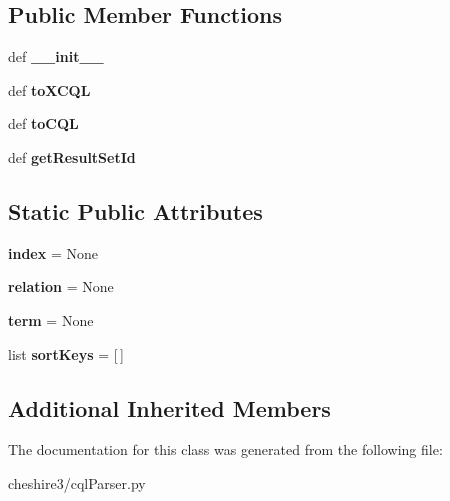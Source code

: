 \subsection*{Public Member Functions}
\begin{DoxyCompactItemize}
\item 
\hypertarget{classcheshire3_1_1cql_parser_1_1_search_clause_a29fa02f4112b5f9c53332258df13b3c6}{def {\bfseries \-\_\-\-\_\-init\-\_\-\-\_\-}}\label{classcheshire3_1_1cql_parser_1_1_search_clause_a29fa02f4112b5f9c53332258df13b3c6}

\item 
\hypertarget{classcheshire3_1_1cql_parser_1_1_search_clause_afaf19325a728553f53a8d809129e4011}{def {\bfseries to\-X\-C\-Q\-L}}\label{classcheshire3_1_1cql_parser_1_1_search_clause_afaf19325a728553f53a8d809129e4011}

\item 
\hypertarget{classcheshire3_1_1cql_parser_1_1_search_clause_a4e4ade8303178425e0bca827fdd34a3c}{def {\bfseries to\-C\-Q\-L}}\label{classcheshire3_1_1cql_parser_1_1_search_clause_a4e4ade8303178425e0bca827fdd34a3c}

\item 
\hypertarget{classcheshire3_1_1cql_parser_1_1_search_clause_ae90ff6f74f12d46195a5ef3fdfa607ae}{def {\bfseries get\-Result\-Set\-Id}}\label{classcheshire3_1_1cql_parser_1_1_search_clause_ae90ff6f74f12d46195a5ef3fdfa607ae}

\end{DoxyCompactItemize}
\subsection*{Static Public Attributes}
\begin{DoxyCompactItemize}
\item 
\hypertarget{classcheshire3_1_1cql_parser_1_1_search_clause_a00c1c24147a45070b366e256f4e92d91}{{\bfseries index} = None}\label{classcheshire3_1_1cql_parser_1_1_search_clause_a00c1c24147a45070b366e256f4e92d91}

\item 
\hypertarget{classcheshire3_1_1cql_parser_1_1_search_clause_a9ca0cf062af14d6995e9877bc8603791}{{\bfseries relation} = None}\label{classcheshire3_1_1cql_parser_1_1_search_clause_a9ca0cf062af14d6995e9877bc8603791}

\item 
\hypertarget{classcheshire3_1_1cql_parser_1_1_search_clause_a88e24294304ad71fe035cf32597eb3d2}{{\bfseries term} = None}\label{classcheshire3_1_1cql_parser_1_1_search_clause_a88e24294304ad71fe035cf32597eb3d2}

\item 
\hypertarget{classcheshire3_1_1cql_parser_1_1_search_clause_a3aa26092d3c81decddfb50ad757dd080}{list {\bfseries sort\-Keys} = \mbox{[}$\,$\mbox{]}}\label{classcheshire3_1_1cql_parser_1_1_search_clause_a3aa26092d3c81decddfb50ad757dd080}

\end{DoxyCompactItemize}
\subsection*{Additional Inherited Members}


The documentation for this class was generated from the following file\-:\begin{DoxyCompactItemize}
\item 
cheshire3/cql\-Parser.\-py\end{DoxyCompactItemize}
